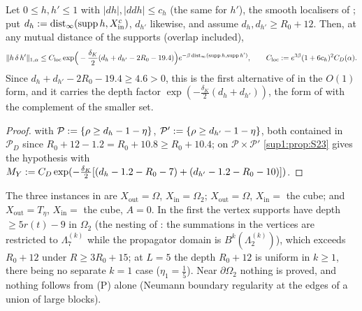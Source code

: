 \begin{corollary}[the consumed form at $L=5$]\label{sup1:cor:S24}
Let $0\le h,h'\le1$ with $|dh|,|ddh|\le c_h$ (the same for $h'$), the smooth localisers of \cite[(1.33)]{Ba3}; put $d_h:=\operatorname{dist}_\infty(\operatorname{supp} h,X_{\mathrm{in}}^c)$, $d_{h'}$ likewise, and assume $d_h,d_{h'}\ge R_0+12$. Then, at any mutual distance of the supports (overlap included),
\[
\lVert h\,\delta\,h'\rVert_{1,\alpha}\le C_{\mathrm{loc}}\exp\!\Big(-\frac{\delta_K}2(d_h+d_{h'}-2R_0-19.4)\Big)e^{-\beta\operatorname{dist}_\infty(\operatorname{supp} h,\operatorname{supp} h')},\qquad C_{\mathrm{loc}}:= e^{3\beta}(1+6c_h)^2C_D(\alpha).
\]
Since $d_h+d_{h'}-2R_0-19.4\ge4.6>0$, this is the first alternative of \cite[(2.5)]{Ba3} in the $O(1)$ form, and it carries the depth factor $\exp(-\frac{\delta_K}2(d_h+d_{h'}))$, the form of \cite[(2.26)]{Ba1} with the complement of the smaller set.
\end{corollary}

\begin{proof}
 with $\mathcal P:=\{\rho\ge d_h-1-\eta\}$, $\mathcal P':=\{\rho\ge d_{h'}-1-\eta\}$, both contained in $\mathcal P_D$ since $R_0+12-1.2=R_0+10.8\ge R_0+10.4$; on $\mathcal P\times\mathcal P'$ \cref{sup1:prop:S23} gives the hypothesis with $M_Y:= C_D\exp(-\frac{\delta_K}2[(d_h-1.2-R_0-7)+(d_{h'}-1.2-R_0-10)])$.
\end{proof}

\begin{remark}\label{sup1:rem:S2}
The three instances in \cite{Ba1,Ba2} are $X_{\mathrm{out}}=\Omega$, $X_{\mathrm{in}}=\Omega_2$; $X_{\mathrm{out}}=\Omega$, $X_{\mathrm{in}}=$ the cube; and $X_{\mathrm{out}}=T_\eta$, $X_{\mathrm{in}}=$ the cube, $A=0$. In the first the vertex supports have depth $\ge5r(t)-9$ in $\Omega_2$ (the nesting of \cite[pp.~579--580]{Ba2}: the summations in the vertices are restricted to $\Lambda^{(k)}_7$ while the propagator domain is $B^k(\Lambda^{(k)}_2)$), which exceeds $R_0+12$ under $R\ge3R_0+15$; at $L=5$ the depth $R_0+12$ is uniform in $k\ge1$, there being no separate $k=1$ case ($\eta_1=\frac15$). Near $\partial\Omega_2$ nothing is proved, and nothing follows from (P) alone (Neumann boundary regularity at the edges of a union of large blocks).
\end{remark}

